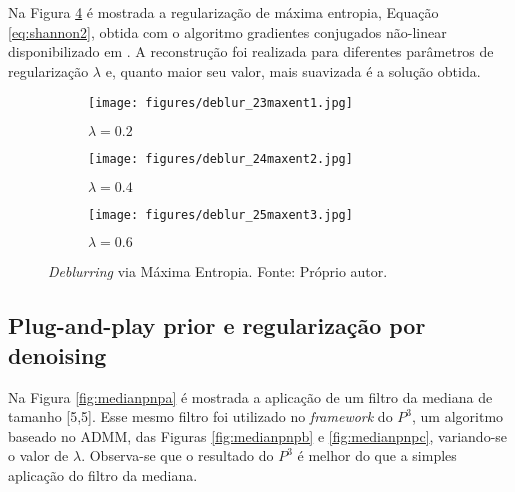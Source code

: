 Na Figura \ref{fig:maxent} é mostrada a regularização de máxima entropia, Equação \eqref{eq:shannon2}, obtida com o algoritmo gradientes conjugados não-linear disponibilizado em \cite{Hansen2007}. A reconstrução foi realizada para diferentes parâmetros de regularização $\lambda$ e, quanto maior seu valor, mais suavizada é a solução obtida.
\begin{figure}[H]
     \centering
     \begin{subfigure}[b]{0.32\textwidth}
         \centering
         \texttt{[image: figures/deblur\_23maxent1.jpg]}
         \caption{$\lambda = 0.2$}
         \label{fig:maxenta}
     \end{subfigure}
     \hfill
     \begin{subfigure}[b]{0.32\textwidth}
         \centering
                  \texttt{[image: figures/deblur\_24maxent2.jpg]}
         \caption{$\lambda = 0.4$}
         \label{fig:maxentb}
     \end{subfigure}
          \hfill
     \begin{subfigure}[b]{0.32\textwidth}
         \centering
                  \texttt{[image: figures/deblur\_25maxent3.jpg]}
         \caption{$\lambda = 0.6$}
         \label{fig:maxentc}
     \end{subfigure}
\caption[\textit{Deblurring} via Máxima Entropia.]{\textit{Deblurring} via Máxima Entropia. Fonte: Próprio autor.}
\label{fig:maxent}
\end{figure}

\subsection{Plug-and-play prior e regularização por denoising}

Na Figura \ref{fig:medianpnpa} é mostrada a aplicação de um filtro da mediana de tamanho [5,5]. Esse mesmo filtro  foi utilizado no \textit{framework} do $P^3$, um algoritmo baseado no ADMM, das Figuras \ref{fig:medianpnpb} e \ref{fig:medianpnpc}, variando-se o valor de $\lambda$. Observa-se que o resultado do $P^3$ é melhor do que a simples aplicação do filtro da mediana. 

